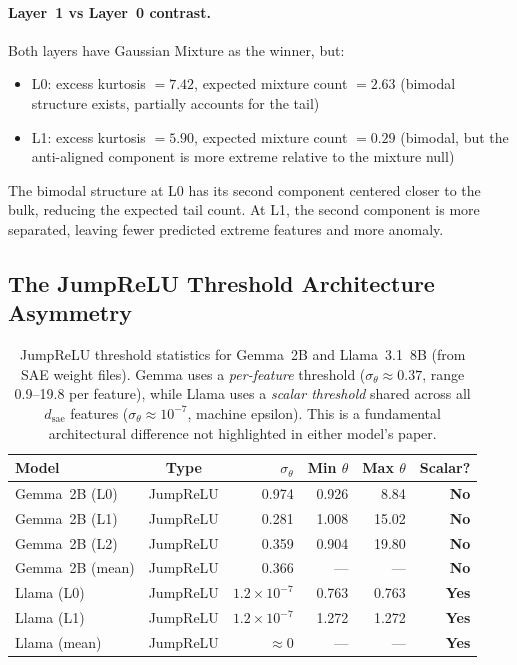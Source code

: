 \documentclass[11pt,a4paper]{article}
\begin{document}
\paragraph{Layer~1 vs Layer~0 contrast.} Both layers have Gaussian Mixture as the winner, but:
\begin{itemize}[nosep]
  \item L0: excess kurtosis $= 7.42$, expected mixture count $= 2.63$ (bimodal structure exists, partially accounts for the tail)
  \item L1: excess kurtosis $= 5.90$, expected mixture count $= 0.29$ (bimodal, but the anti-aligned component is more extreme relative to the mixture null)
\end{itemize}
The bimodal structure at L0 has its second component centered closer to the bulk, reducing the expected tail count. At L1, the second component is more separated, leaving fewer predicted extreme features and more anomaly.

\subsection{The JumpReLU Threshold Architecture Asymmetry}
\label{sec:threshold}

\begin{table}[H]
\centering
\caption{JumpReLU threshold statistics for Gemma~2B and Llama~3.1~8B (from SAE weight files). Gemma uses a \emph{per-feature} threshold ($\sigma_\theta \approx 0.37$, range 0.9--19.8 per feature), while Llama uses a \emph{scalar threshold} shared across all $d_\text{sae}$ features ($\sigma_\theta \approx 10^{-7}$, machine epsilon). This is a fundamental architectural difference not highlighted in either model's paper.}
\label{tab:thresholds}
\begin{tabular}{@{}lcrrrr@{}}
\toprule
Model & Type & $\sigma_\theta$ & Min $\theta$ & Max $\theta$ & Scalar? \\
\midrule
Gemma~2B (L0) & JumpReLU & 0.974 & 0.926 & 8.84 & \textbf{No} \\
Gemma~2B (L1) & JumpReLU & 0.281 & 1.008 & 15.02 & \textbf{No} \\
Gemma~2B (L2) & JumpReLU & 0.359 & 0.904 & 19.80 & \textbf{No} \\
Gemma~2B (mean) & JumpReLU & 0.366 & --- & --- & \textbf{No} \\
\midrule
Llama (L0) & JumpReLU & $1.2\times10^{-7}$ & 0.763 & 0.763 & \textbf{Yes} \\
Llama (L1) & JumpReLU & $1.2\times10^{-7}$ & 1.272 & 1.272 & \textbf{Yes} \\
Llama (mean) & JumpReLU & $\approx 0$ & --- & --- & \textbf{Yes} \\
\bottomrule
\end{tabular}
\end{table}
\end{document}
